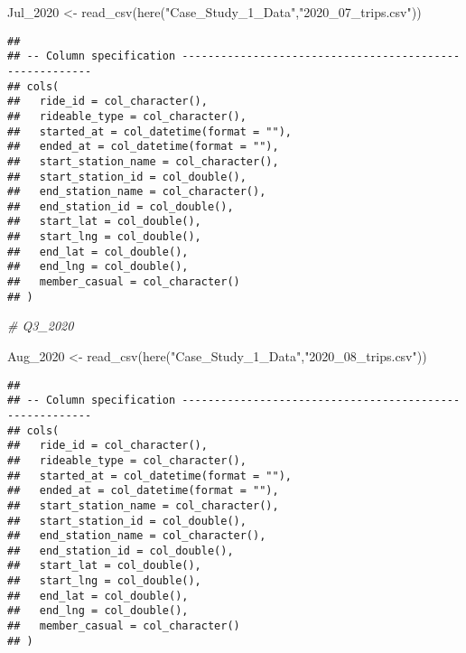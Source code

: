 \documentclass[
]{article}
\newenvironment{Shaded}{\begin{snugshade}}{\end{snugshade}}
\newcommand{\CommentTok}[1]{\textcolor[rgb]{0.56,0.35,0.01}{\textit{#1}}}
\newcommand{\FunctionTok}[1]{\textcolor[rgb]{0.00,0.00,0.00}{#1}}
\newcommand{\NormalTok}[1]{#1}
\newcommand{\OtherTok}[1]{\textcolor[rgb]{0.56,0.35,0.01}{#1}}
\newcommand{\StringTok}[1]{\textcolor[rgb]{0.31,0.60,0.02}{#1}}
\begin{document}
\begin{Shaded}
\begin{Highlighting}[]
\NormalTok{ Jul\_2020 }\OtherTok{\textless{}{-}} \FunctionTok{read\_csv}\NormalTok{(}\FunctionTok{here}\NormalTok{(}\StringTok{"Case\_Study\_1\_Data"}\NormalTok{,}\StringTok{"2020\_07\_trips.csv"}\NormalTok{))}
\end{Highlighting}
\end{Shaded}

\begin{verbatim}
## 
## -- Column specification --------------------------------------------------------
## cols(
##   ride_id = col_character(),
##   rideable_type = col_character(),
##   started_at = col_datetime(format = ""),
##   ended_at = col_datetime(format = ""),
##   start_station_name = col_character(),
##   start_station_id = col_double(),
##   end_station_name = col_character(),
##   end_station_id = col_double(),
##   start_lat = col_double(),
##   start_lng = col_double(),
##   end_lat = col_double(),
##   end_lng = col_double(),
##   member_casual = col_character()
## )
\end{verbatim}

\begin{Shaded}
\begin{Highlighting}[]
\CommentTok{\# Q3\_2020 }
\end{Highlighting}
\end{Shaded}

\begin{Shaded}
\begin{Highlighting}[]
\NormalTok{ Aug\_2020 }\OtherTok{\textless{}{-}} \FunctionTok{read\_csv}\NormalTok{(}\FunctionTok{here}\NormalTok{(}\StringTok{"Case\_Study\_1\_Data"}\NormalTok{,}\StringTok{"2020\_08\_trips.csv"}\NormalTok{))}
\end{Highlighting}
\end{Shaded}

\begin{verbatim}
## 
## -- Column specification --------------------------------------------------------
## cols(
##   ride_id = col_character(),
##   rideable_type = col_character(),
##   started_at = col_datetime(format = ""),
##   ended_at = col_datetime(format = ""),
##   start_station_name = col_character(),
##   start_station_id = col_double(),
##   end_station_name = col_character(),
##   end_station_id = col_double(),
##   start_lat = col_double(),
##   start_lng = col_double(),
##   end_lat = col_double(),
##   end_lng = col_double(),
##   member_casual = col_character()
## )
\end{verbatim}
\end{document}
